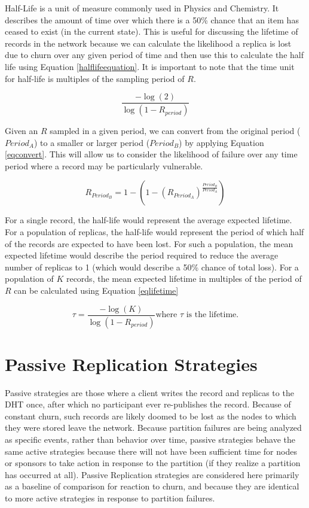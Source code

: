 Half-Life is a unit of measure commonly used in Physics and Chemistry.
It describes the amount of time over which there is a 50\% chance that an item has ceased to exist (in the current state).
This is useful for discussing the lifetime of records in the network because we can calculate the likelihood a replica is lost due to churn over any given period of time and then use this to calculate the half life using Equation \ref{halflifeequation}.
It is important to note that the time unit for half-life is multiples of the sampling period of $R$.

\begin{equation}
\frac{-\log(2)}{\log(1-R_{period})}
\label{halflifeequation}
\end{equation}

Given an $R$ sampled in a given period, we can convert from the original period ($Period_{A}$) to a smaller or larger period ($Period_{B}$) by applying Equation \ref{eqconvert}.
This will allow us to consider the likelihood of failure over any time period where a record may be particularly vulnerable.

\begin{equation}
R_{Period_{B}}=1-(1-(R_{Period_{A}})^{\frac{Period_{B}}{Period_{A}}})
\label{eqconvert}
\end{equation}

For a single record, the half-life would represent the average expected lifetime.
For a population of replicas, the half-life would represent the period of which half of the records are expected to have been lost.
For such a population, the mean expected lifetime would describe the period required to reduce the average number of replicas to 1 (which would describe a 50\% chance of total loss).
For a population of $K$ records, the mean expected lifetime in multiples of the period of $R$ can be calculated using Equation \ref{eqlifetime}

\begin{equation}
\tau = \frac{-\log(K)}{\log(1-R_{period})}
\mbox{where $\tau$ is the lifetime.}
\label{eqlifetime}
\end{equation}


\section{Passive Replication Strategies}

Passive strategies are those where a client writes the record and replicas to the DHT once, after which no participant ever re-publishes the record.
Because of constant churn, such records are likely doomed to be lost as the nodes to which they were stored leave the network.
Because partition failures are being analyzed as specific events, rather than behavior over time, passive strategies behave the same active strategies because there will not have been sufficient time for nodes or sponsors to take action in response to the partition (if they realize a partition has occurred at all).
Passive Replication strategies are considered here primarily as a baseline of comparison for reaction to churn, and because they are identical to more active strategies in response to partition failures. 


